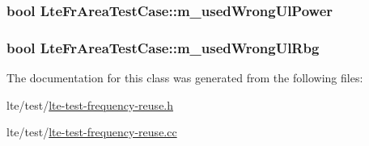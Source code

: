 \subsubsection[{\texorpdfstring{m\+\_\+used\+Wrong\+Ul\+Power}{m_usedWrongUlPower}}]{\setlength{\rightskip}{0pt plus 5cm}bool Lte\+Fr\+Area\+Test\+Case\+::m\+\_\+used\+Wrong\+Ul\+Power\hspace{0.3cm}{\ttfamily [protected]}}\hypertarget{classLteFrAreaTestCase_ab040f873eb53ee13d4f6a2a810545d17}{}\label{classLteFrAreaTestCase_ab040f873eb53ee13d4f6a2a810545d17}
\subsubsection[{\texorpdfstring{m\+\_\+used\+Wrong\+Ul\+Rbg}{m_usedWrongUlRbg}}]{\setlength{\rightskip}{0pt plus 5cm}bool Lte\+Fr\+Area\+Test\+Case\+::m\+\_\+used\+Wrong\+Ul\+Rbg\hspace{0.3cm}{\ttfamily [protected]}}\hypertarget{classLteFrAreaTestCase_a11e401119f17b78d6693ef29f82b8895}{}\label{classLteFrAreaTestCase_a11e401119f17b78d6693ef29f82b8895}


The documentation for this class was generated from the following files\+:\begin{DoxyCompactItemize}
\item 
lte/test/\hyperlink{lte-test-frequency-reuse_8h}{lte-\/test-\/frequency-\/reuse.\+h}\item 
lte/test/\hyperlink{lte-test-frequency-reuse_8cc}{lte-\/test-\/frequency-\/reuse.\+cc}\end{DoxyCompactItemize}

